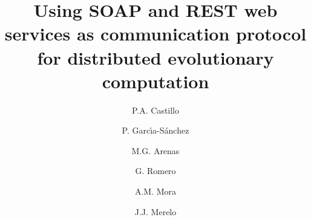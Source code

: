 \documentclass[final,1p,times]{elsarticle}
\begin{document}
\begin{frontmatter}



\title{Using SOAP and REST web services as communication protocol for distributed evolutionary computation}

\author[ugr]{P.A. Castillo}
\author[ugr]{P. Garc\'{\i}a-S\'{a}nchez}
\author[ugr]{M.G. Arenas}
\author[ugr]{G. Romero}
\author[ugr]{A.M. Mora}
\author[ugr]{J.J. Merelo}

\address[ugr]{Department of Computer Architecture and Computer Technology and CITIC-UGR, University of Granada, Granada, Spain. Tel: +34958240589. Fax: +34958248993}



\end{frontmatter}
\end{document}
